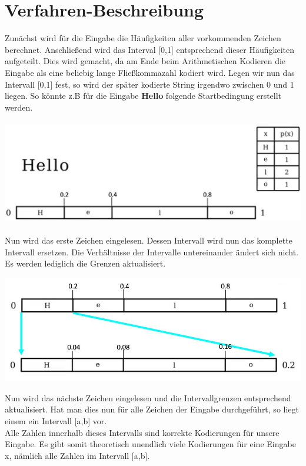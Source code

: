 \documentclass[a4paper]{article}
\theoremstyle{definition}
\theoremstyle{remark}
\begin{document}
		\section{Verfahren-Beschreibung}
Zunächst wird für die Eingabe die Häufigkeiten aller vorkommenden Zeichen berechnet. Anschließend wird das Interval [0,1] entsprechend dieser Häufigkeiten aufgeteilt. Dies wird gemacht, da am Ende  beim Arithmetischen Kodieren die Eingabe als eine beliebig lange Fließkommazahl kodiert wird. Legen wir nun das Intervall [0,1] fest, so wird der später kodierte String irgendwo zwischen 0 und 1 liegen.
So könnte z.B für die Eingabe \textbf{Hello} folgende Startbedingung erstellt werden.
\\\\
\includegraphics[scale=0.5]{schritt1}
\\\\
Nun wird das erste Zeichen eingelesen. Dessen Intervall wird nun das komplette Intervall ersetzen. Die Verhältnisse der Intervalle untereinander ändert sich nicht. Es werden lediglich die Grenzen aktualisiert.
\\
\begin{center}
\includegraphics[scale=0.5]{schritt2}
\end{center}
Nun wird das nächste Zeichen eingelesen und die Intervallgrenzen entsprechend aktualisiert. Hat man dies nun für alle Zeichen der Eingabe durchgeführt, so liegt einem ein Intervall [a,b] vor.\\
Alle Zahlen innerhalb dieses Intervalls sind korrekte Kodierungen für unsere Eingabe. Es gibt somit theoretisch unendlich viele Kodierungen für eine Eingabe x, nämlich alle Zahlen im Intervall [a,b].\\
\end{document}

